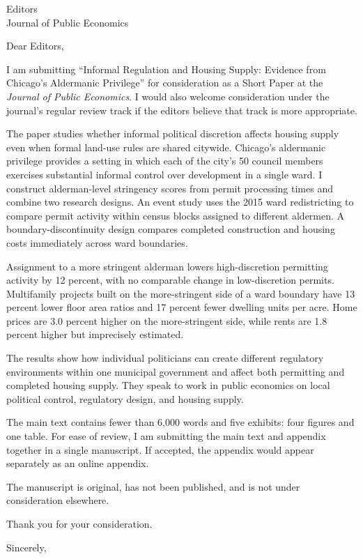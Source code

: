 \documentclass[11pt]{letter}
\begin{document}
\begin{letter}{Editors\\
Journal of Public Economics}

\opening{Dear Editors,}

I am submitting ``Informal Regulation and Housing Supply: Evidence from
Chicago's Aldermanic Privilege'' for consideration as a Short Paper at the
\textit{Journal of Public Economics}. I would also welcome consideration under
the journal's regular review track if the editors believe that track is more
appropriate.

The paper studies whether informal political discretion affects housing supply
even when formal land-use rules are shared citywide. Chicago's aldermanic
privilege provides a setting in which each of the city's 50 council members exercises
substantial informal control over development in a single ward. I construct
alderman-level stringency scores from permit processing times and combine two
research designs. An event study uses the 2015 ward redistricting to compare
permit activity within census blocks assigned to different aldermen. A
boundary-discontinuity design compares completed construction and housing costs
immediately across ward boundaries.

Assignment to a more stringent alderman lowers high-discretion permitting
activity by 12 percent, with no comparable change in low-discretion permits.
Multifamily projects built on the more-stringent side of a ward boundary have
13 percent lower floor area ratios and 17 percent fewer dwelling units per
acre. Home prices are 3.0 percent higher on the more-stringent side, while rents
are 1.8 percent higher but imprecisely estimated.

The results show how individual politicians can create different regulatory
environments within one municipal government and affect both permitting and
completed housing supply. They speak to work in public economics on local
political control, regulatory design, and housing supply.

The main text contains fewer than 6,000 words and five exhibits: four figures
and one table. For ease of review, I am submitting the main text and appendix
together in a single manuscript. If accepted, the appendix would appear
separately as an online appendix.

The manuscript is original, has not been published, and is not under
consideration elsewhere.

Thank you for your consideration.

\closing{Sincerely,}

\end{letter}
\end{document}
